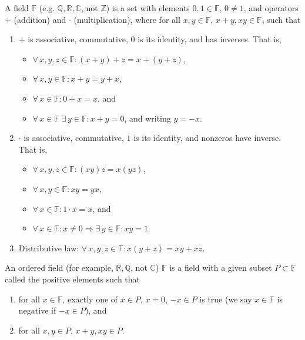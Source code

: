\documentclass{notes}
\begin{document}
\begin{defn}
  A field $\mathbb F$ (e.g. $\mathbb Q, \mathbb R, \mathbb C$, not $\mathbb Z$) is a set with elements $0, 1 \in \mathbb F$, $0 \neq 1$, and operators $+$ (addition) and $\cdot$ (multiplication), where for all $x, y \in \mathbb F$, $x + y, x y \in \mathbb F$, such that
  \begin{enumerate}
    \item $+$ is associative, commutative, $0$ is its identity, and has inverses.
    That is, 
    \begin{itemize}
      \item $\forall \, x, y, z \in \mathbb F: (x + y) + z = x + (y + z)$, 

      \item $\forall \, x, y \in \mathbb F: x + y = y + x$, 

      \item $\forall \, x \in \mathbb F: 0 + x = x$, and

      \item $\forall \, x \in \mathbb F \; \exists \, y \in \mathbb F: x + y = 0$, and writing $y = -x$.
    \end{itemize}

    \item $\cdot$ is associative, commutative, $1$ is its identity, and nonzeros have inverse.
    That is, 
    \begin{itemize}
      \item $\forall \, x, y, z \in \mathbb F: (x y) z = x (y z)$, 

      \item $\forall \, x, y \in \mathbb F: x y = y x$, 

      \item $\forall \, x \in \mathbb F: 1 \cdot x = x$, and 

      \item $\forall \, x \in \mathbb F: x \neq 0 \Rightarrow \exists \, y \in \mathbb F: x y = 1$.
    \end{itemize}

    \item Distributive law: $\forall \, x, y, z \in \mathbb F: x (y + z) = x y + x z$.
  \end{enumerate}
\end{defn}

\begin{defn}
  An ordered field (for example, $\mathbb R, \mathbb Q$, not $\mathbb C$) $\mathbb F$ is a field with a given subset $P \subset \mathbb F$ called the positive elements such that 
  \begin{enumerate}
    \item for all $x \in \mathbb F$, exactly one of $x \in P$, $x = 0$, $-x \in P$ is true (we say $x \in \mathbb F$ is negative if $-x \in P$), and 

    \item for all $x, y \in P$, $x + y, x y \in P$.
  \end{enumerate}
\end{defn}
\end{document}
